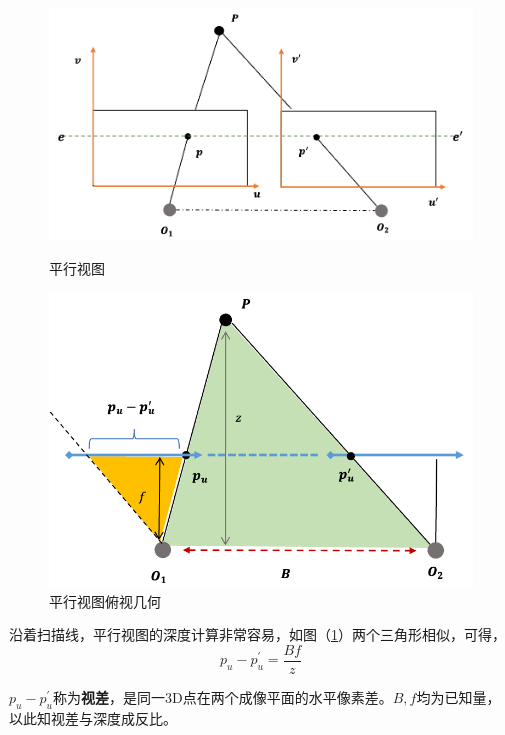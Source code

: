 		\begin{figure}[H]
			\begin{minipage}[t]{0.49\linewidth}
				\centering
				\includegraphics[width=\textwidth]{../images/two_stereo.png}
				\caption{平行视图}
				\label{two_stereo}
			\end{minipage}
			\begin{minipage}[t]{0.49\linewidth}
				\centering
				\includegraphics[width=\textwidth]{../images/two_stereo_depth.png}
				\caption{平行视图俯视几何}
				\label{two_stereo_gemotry}
			\end{minipage}			
		\end{figure}

		沿着扫描线，平行视图的深度计算非常容易，如图（\ref{two_stereo_gemotry}）两个三角形相似，可得，
		$$
			p_u - p^\prime_u = \frac{Bf}{z}
		$$

		$p_u - p^\prime_u$称为\textbf{视差}，是同一3D点在两个成像平面的水平像素差。$B,f$均为已知量，以此知视差与深度成反比。

